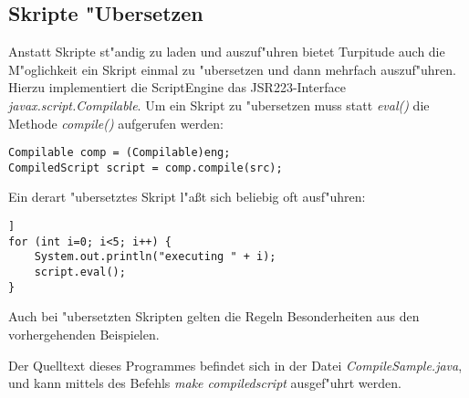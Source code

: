 \subsection{Skripte "Ubersetzen}
\label{sec:app1:compile}

Anstatt Skripte st"andig zu laden und auszuf"uhren bietet Turpitude auch die M"oglichkeit
ein Skript einmal zu "ubersetzen und dann mehrfach auszuf"uhren. Hierzu implementiert
die ScriptEngine das JSR223-Interface \emph{javax.script.Compilable}. Um ein Skript
zu "ubersetzen muss statt \emph{eval()} die Methode \emph{compile()} aufgerufen werden:
\begin{lstlisting}[caption="Ubersetzen eine Skriptes]
Compilable comp = (Compilable)eng;
CompiledScript script = comp.compile(src);
\end{lstlisting}
Ein derart "ubersetztes Skript l"a\ss t sich beliebig oft ausf"uhren:
\begin{lstlisting}[caption=Ausf"uhren des "ubersetzten Skriptes]]
for (int i=0; i<5; i++) {
    System.out.println("executing " + i);
    script.eval();
}
\end{lstlisting}
Auch bei "ubersetzten Skripten gelten die Regeln Besonderheiten aus den vorhergehenden
Beispielen.

Der Quelltext dieses Programmes befindet sich in der Datei \emph{CompileSample.java}, 
und kann mittels des Befehls \emph{make compiledscript} ausgef"uhrt werden.

